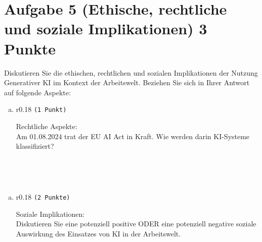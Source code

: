 \documentclass[12pt, ngerman]{AssignmentClass}
\begin{document}
\newpage

\section*{Aufgabe 5 (Ethische, rechtliche und soziale Implikationen) \hfill 3 Punkte}
    Diskutieren Sie die ethischen, rechtlichen und sozialen Implikationen der Nutzung Generativer KI im Kontext der Arbeitswelt. Beziehen Sie sich in Ihrer Antwort auf folgende Aspekte:

    \begin{enumerate}[a)]
		\item 
			\begin{minipage}[t]{\linewidth}
				\vspace{-0.61em}
				\begin{wrapfigure}[2]{r}{0.18\linewidth} 
					\raggedleft
					\texttt{(1 Punkt)}
				\end{wrapfigure}
                Rechtliche Aspekte:\\
                Am 01.08.2024 trat der EU AI Act in Kraft. Wie werden darin KI-Systeme klassifiziert?
			\end{minipage}
	\end{enumerate}
 
	\begin{solution}
		\noindent
		\\
	\end{solution}

    \begin{answerbox}
		\noindent
		\fbox{\parbox[c]{\textwidth}{
				\vspace{4cm}
				\hspace{\textwidth}
		}}\\
	\end{answerbox}

    \begin{enumerate}[b)]
		\item 
			\begin{minipage}[t]{\linewidth}
				\vspace{-0.61em}
				\begin{wrapfigure}[2]{r}{0.18\linewidth} 
					\raggedleft
					\texttt{(2 Punkte)}
				\end{wrapfigure}
                Soziale Implikationen:\\
                Diskutieren Sie eine potenziell positive ODER eine potenziell negative soziale Auswirkung des Einsatzes von KI in der Arbeitswelt.
			\end{minipage}
	\end{enumerate}
 
\end{document}

